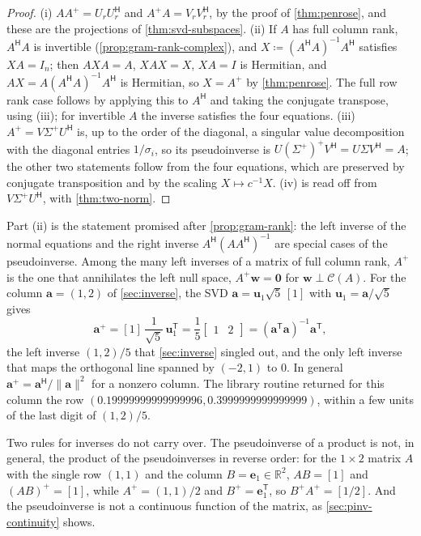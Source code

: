 \begin{proof}
(i) $AA^+=U_rU_r^{\mathsf H}$ and $A^+A=V_rV_r^{\mathsf H}$, by the proof of \cref{thm:penrose}, and these are the projections of \cref{thm:svd-subspaces}. (ii) If $A$ has full column rank, $A^{\mathsf H}A$ is invertible (\cref{prop:gram-rank-complex}), and $X\coloneqq(A^{\mathsf H}A)^{-1}A^{\mathsf H}$ satisfies $XA=I_n$; then $AXA=A$, $XAX=X$, $XA=I$ is Hermitian, and $AX=A(A^{\mathsf H}A)^{-1}A^{\mathsf H}$ is Hermitian, so $X=A^+$ by \cref{thm:penrose}. The full row rank case follows by applying this to $A^{\mathsf H}$ and taking the conjugate transpose, using (iii); for invertible $A$ the inverse satisfies the four equations. (iii) $A^+=V\Sigma^+U^{\mathsf H}$ is, up to the order of the diagonal, a singular value decomposition with the diagonal entries $1/\sigma_i$, so its pseudoinverse is $U(\Sigma^+)^+V^{\mathsf H}=U\Sigma V^{\mathsf H}=A$; the other two statements follow from the four equations, which are preserved by conjugate transposition and by the scaling $X\mapsto c^{-1}X$. (iv) is read off from $V\Sigma^+U^{\mathsf H}$, with \cref{thm:two-norm}.
\end{proof}

Part (ii) is the statement promised after \cref{prop:gram-rank}: the left inverse of the normal equations and the right inverse $A^{\mathsf H}(AA^{\mathsf H})^{-1}$ are special cases of the pseudoinverse. Among the many left inverses of a matrix of full column rank, $A^+$ is the one that annihilates the left null space, $A^+\mathbf w=\mathbf 0$ for $\mathbf w\perp\mathcal C(A)$. For the column $\mathbf a=(1,2)$ of \cref{sec:inverse}, the SVD $\mathbf a=\mathbf u_1\sqrt5\,[1]$ with $\mathbf u_1=\mathbf a/\sqrt5$ gives
\[
\mathbf a^+=[1]\,\frac1{\sqrt5}\,\mathbf u_1^{\mathsf T}=\frac15\begin{bmatrix}1&2\end{bmatrix}=(\mathbf a^{\mathsf T}\mathbf a)^{-1}\mathbf a^{\mathsf T},
\]
the left inverse $(1,2)/5$ that \cref{sec:inverse} singled out, and the only left inverse that maps the orthogonal line spanned by $(-2,1)$ to $0$. In general $\mathbf a^+=\mathbf a^{\mathsf H}/\|\mathbf a\|^2$ for a nonzero column. The library routine  returned for this column the row $(0.19999999999999996,0.3999999999999999)$, within a few units of the last digit of $(1,2)/5$.

Two rules for inverses do not carry over. The pseudoinverse of a product is not, in general, the product of the pseudoinverses in reverse order: for the $1\times2$ matrix $A$ with the single row $(1,1)$ and the column $B=\mathbf e_1\in\mathbb R^2$, $AB=[1]$ and $(AB)^+=[1]$, while $A^+=(1,1)/2$ and $B^+=\mathbf e_1^{\mathsf T}$, so $B^+A^+=[1/2]$. And the pseudoinverse is not a continuous function of the matrix, as \cref{sec:pinv-continuity} shows.

